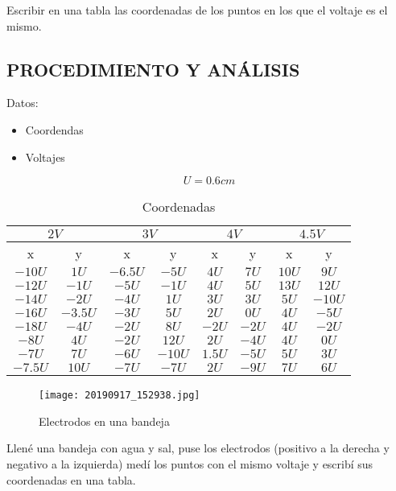 \documentclass[10pt, twoside]{article}
\begin{document}
Escribir en una tabla las coordenadas de los puntos en los que
el voltaje es el mismo.

\subsection{PROCEDIMIENTO Y ANÁLISIS}%
Datos:
\begin{itemize}
	\item Coordendas
	\item Voltajes
\end{itemize}

\[
	U = 0.6cm
\]

\begin{table}[H]
	\centering
	\caption{Coordenadas}
	\label{tab:coordenadas}
	\begin{tabular}{c|c||c|c||c|c||c|c}
		\multicolumn{2}{c||}{$2V$}
		&\multicolumn{2}{c||}{$3V$}
		&\multicolumn{2}{c||}{$4V$}
		&\multicolumn{2}{c}{$4.5V$}\\
		\hline
		\hline
		x & y & x & y & x & y & x & y\\
		\hline
		$-10U$ & $1U$ & $-6.5U$ & $-5U$ & $4U$ & $7U$ & $10U$ & $9U$\\
		\hline
		$-12U$ & $-1U$ & $-5U$ & $-1U$ & $4U$ & $5U$ & $13U$ & $12U$\\
		\hline
		$-14U$ & $-2U$ & $-4U$ & $1U$ & $3U$ & $3U$ & $5U$ & $-10U$\\
		\hline
		$-16U$ & $-3.5U$ & $-3U$ & $5U$ & $2U$ & $0U$ & $4U$ & $-5U$\\
		\hline
		$-18U$ & $-4U$ & $-2U$ & $8U$ & $-2U$ & $-2U$ & $4U$ & $-2U$\\
		\hline
		$-8U$ & $4U$ & $-2U$ & $12U$ & $2U$ & $-4U$ & $4U$ & $0U$\\
		\hline
		$-7U$ & $7U$ & $-6U$ & $-10U$ & $1.5U$ & $-5U$ & $5U$ & $3U$\\
		\hline
		$-7.5U$ & $10U$ & $-7U$ & $-7U$ & $2U$ & $-9U$ & $7U$ & $6U$\\
		\hline
	\end{tabular}
\end{table}

\begin{figure}[H]
	\centering
	\texttt{[image: 20190917\_152938.jpg]}
	\caption{Electrodos en una bandeja}%
	\label{fig:bandeja}
\end{figure}

Llené una bandeja con agua y sal,
puse los electrodos (positivo a la derecha y negativo a la izquierda)
medí los puntos con el mismo voltaje
y escribí sus coordenadas en una tabla.
\end{document}
